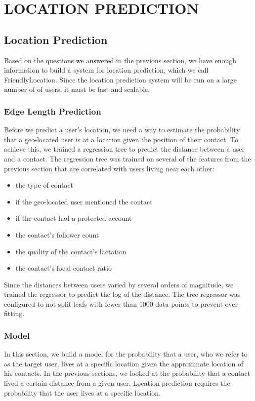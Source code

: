\ifdefined\THESIS
    \chapter{\uppercase{Location Prediction}}
\else
    \section{Location Prediction}
\fi

Based on the questions we answered in the previous section, we have enough
information to build a system for location prediction, which we call
FriendlyLocation.
Since the location prediction system will be run on a large number of of users,
it must be fast and scalable.

\subsection{Edge Length Prediction}

Before we predict a user's location, we need a way to estimate the probability
that a geo-located user is at a location given the position of their contact.
%
To achieve this, we trained a regression tree to predict the distance between a
user and a contact.
%
The regression tree was trained on several of the features from the previous
section that are correlated with users living near each other:
\begin{itemize}
\item the type of contact
\item if the geo-located user mentioned the contact
\item if the contact had a protected account
\item the contact's follower count
\item the quality of the contact's lactation
\item the contact's local contact ratio
\end{itemize}
%
Since the distances between users varied by several orders of magnitude, we
trained the regressor to predict the log of the distance.
%
The tree regressor was configured to not split leafs with fewer than 1000 data
points to prevent over-fitting.


\subsection{Model}
\label{sec:model}

In this section, we build a model for the probability that a user, who we refer
to as the target user, lives at a specific location given the approximate
location of his contacts.
%
In the previous sections, we looked at the probability that a contact lived a
certain distance from a given user.
%
Location prediction requires the probability that the user lives at a specific
location.


